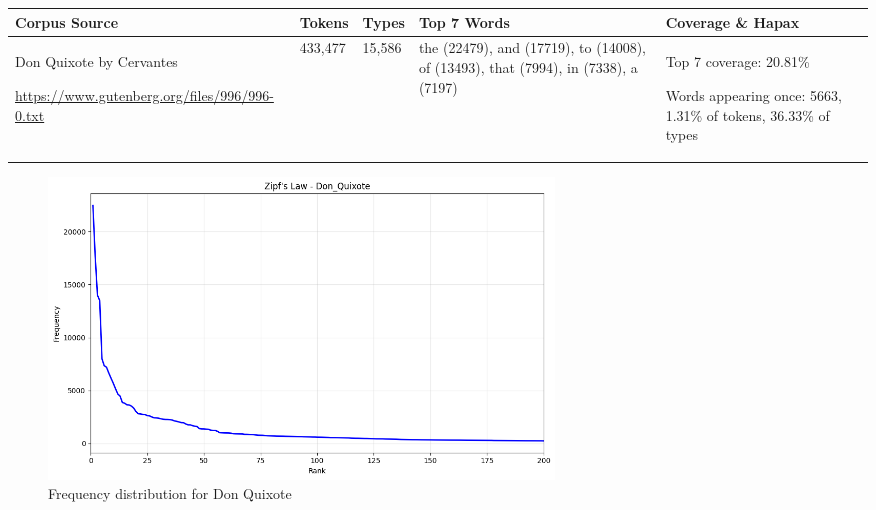 \documentclass[11pt]{article}
\begin{document}
\begin{table}[h]
\centering
\small
\begin{tabularx}{\textwidth}{|X|X|X|X|X|}
\hline
\textbf{Corpus Source} & \textbf{Tokens} & \textbf{Types} & \textbf{Top 7 Words} & \textbf{Coverage \& Hapax} \\
\hline
Don Quixote by Cervantes

\url{https://www.gutenberg.org/files/996/996-0.txt} & 433,477 & 15,586 & the (22479), and (17719), to (14008), of (13493), that (7994), in (7338), a (7197) & Top 7 coverage: 20.81\%

Words appearing once: 5663, 1.31\% of tokens, 36.33\% of types \\
\hline
\end{tabularx}
\end{table}

\begin{figure}[h]
\centering
\includegraphics[width=0.65\textwidth]{zipf_don_quixote.png}
\caption{Frequency distribution for Don Quixote}
\end{figure}
\end{document}
